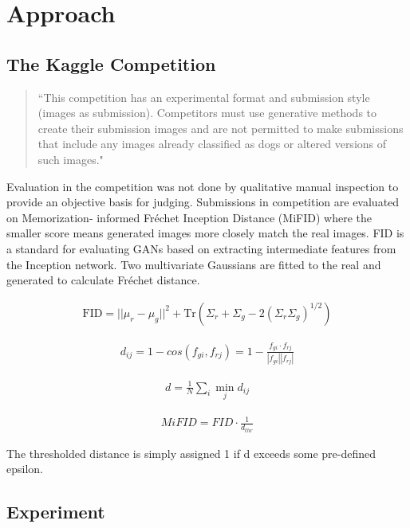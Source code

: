 \documentclass[10pt,twocolumn,letterpaper]{article}
\begin{document}
\section{Approach}

\subsection{The Kaggle Competition}

\small\begin{quote}
``This competition has an experimental format and submission style (images as submission).
Competitors must use generative methods to create their submission images and
are not permitted to make submissions that include any images already
classified as dogs or altered versions of such images."
\end{quote}

Evaluation in the competition was not done by qualitative manual inspection to provide an
objective basis for judging. Submissions in competition are evaluated on Memorization-
informed Fréchet Inception Distance (MiFID) where the smaller score means generated images
more closely match the real images. FID is a standard for evaluating GANs based on
extracting intermediate features from the Inception network. Two multivariate Gaussians
are fitted to the real and generated to calculate Fréchet distance.

\begin{align*}
  \text{FID} = ||\mu_r - \mu_g||^2 + \text{Tr} (\Sigma_r + \Sigma_g - 2 (\Sigma_r \Sigma_g)^{1/2})
\end{align*}

\begin{align*}
  d_{ij} = 1 - cos(f_{gi}, f_{rj}) = 1 - \frac{f_{gi} \cdot f_{rj}}{|f_{gi}| |f_{rj}|}
\end{align*}

\begin{align*}
  d = \frac{1}{N} \sum_{i} \min_j d_{ij}
\end{align*}

\begin{align*}
  MiFID = FID \cdot \frac{1}{d_{thr}}
\end{align*}

The thresholded distance is simply assigned 1 if d exceeds some pre-defined epsilon.

\subsection{Experiment}
\end{document}
